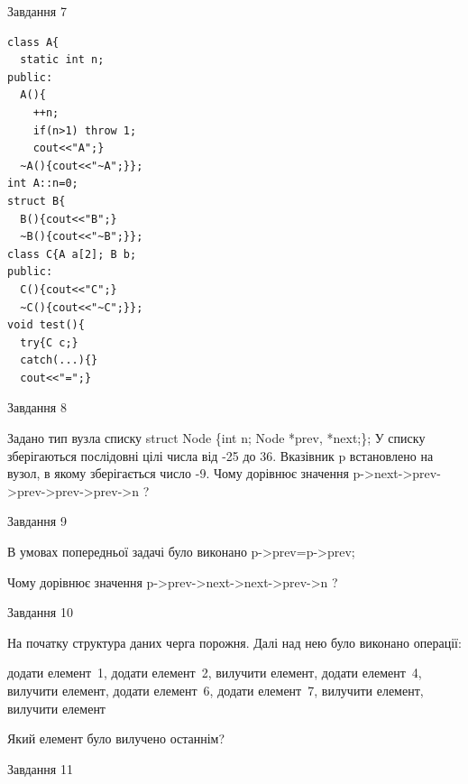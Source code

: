 \documentclass[12pt, ukrainian]{article}
\begin{document}
{{{{{{{{{\begin{minipage}[t]{7cm}
               
{\begin{center}Завдання {7}\end{center}}
\vspace{-6mm}

\begin{verbatim}
class A{
  static int n;
public:
  A(){
    ++n; 
    if(n>1) throw 1;
    cout<<"A";}
  ~A(){cout<<"~A";}};
int A::n=0;
struct B{
  B(){cout<<"B";}
  ~B(){cout<<"~B";}};
class C{A a[2]; B b;
public:
  C(){cout<<"C";}
  ~C(){cout<<"~C";}};
void test(){
  try{C c;} 
  catch(...){} 
  cout<<"=";}
\end{verbatim}            


\end{minipage}
               
{\begin{center}Завдання {8}\end{center}}
\vspace{-6mm}
Задано тип вузла списку
struct Node \{int n; Node *prev, *next;\};
У списку зберігаються послідовні цілі числа від -25 до 36. Вказівник p встановлено на вузол, в якому зберігається число -9.
Чому дорівнює значення p->next->prev->prev->prev->prev->n ?\par

               
{\begin{center}Завдання {9}\end{center}}
\vspace{-6mm}
В умовах попередньої задачі було виконано p->prev=p->prev;

Чому дорівнює значення p->prev->next->next->prev->n ?\par

\newpage
               
{\begin{center}Завдання {10}\end{center}}
\vspace{-6mm}
На початку структура даних черга порожня. Далі над нею було виконано операції:

додати елемент~1, додати елемент~2, вилучити елемент, додати елемент~4, вилучити елемент, додати елемент~6, додати елемент~7, вилучити елемент, вилучити елемент

Який елемент було вилучено останнім?\par

               
{\begin{center}Завдання {11}\end{center}}
\vspace{-6mm}

}}}}}}}}}
\end{document}
